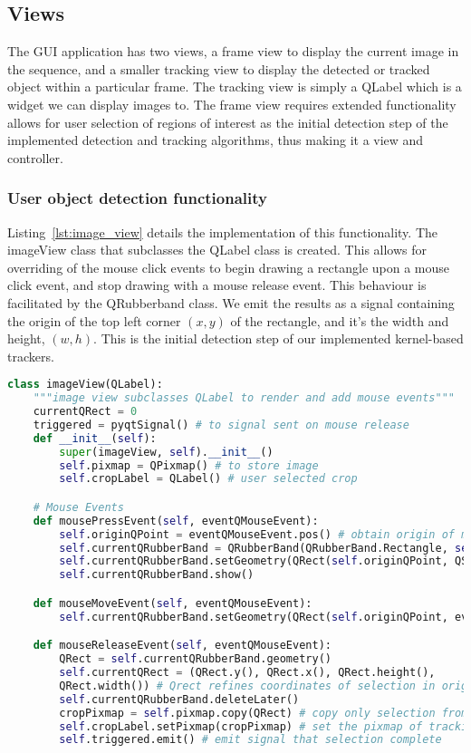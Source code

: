\subsection{Views}
The GUI application has two views, a frame view to display the current image in the
sequence, and a smaller tracking view to display the detected or tracked object
within a particular frame.  
The tracking view is simply a QLabel which is a widget we can display images to.
The frame view requires extended functionality allows for user selection of
regions of interest as the initial detection step of the implemented detection
and tracking algorithms, thus making it a view and controller.

\subsubsection{User object detection functionality}
Listing~\ref{lst:image_view} details the implementation of this
functionality. The imageView class that subclasses the QLabel class is created.
This allows for overriding of the mouse click events to begin drawing a
rectangle upon a mouse click event, and stop drawing with a mouse release event.
This behaviour is facilitated by the QRubberband class. We emit the results as
a signal containing the origin of the top left corner $(x,y)$ of the rectangle, and it's
the width and height, $(w, h)$. This is the initial detection step of our
implemented kernel-based trackers.

\begin{lstlisting}[language=Python, caption={Code for User selection of regions/objects of interest}, captionpos=b, label={lst:image_view}]
class imageView(QLabel):
    """image view subclasses QLabel to render and add mouse events"""
    currentQRect = 0
    triggered = pyqtSignal() # to signal sent on mouse release
    def __init__(self):
        super(imageView, self).__init__()
        self.pixmap = QPixmap() # to store image
        self.cropLabel = QLabel() # user selected crop

    # Mouse Events
    def mousePressEvent(self, eventQMouseEvent):
        self.originQPoint = eventQMouseEvent.pos() # obtain origin of mouse click
        self.currentQRubberBand = QRubberBand(QRubberBand.Rectangle, self) # rubberband selection
        self.currentQRubberBand.setGeometry(QRect(self.originQPoint, QSize())) # 
        self.currentQRubberBand.show()

    def mouseMoveEvent(self, eventQMouseEvent):
        self.currentQRubberBand.setGeometry(QRect(self.originQPoint, eventQMouseEvent.pos()).normalized())

    def mouseReleaseEvent(self, eventQMouseEvent):
        QRect = self.currentQRubberBand.geometry() 
        self.currentQRect = (QRect.y(), QRect.x(), QRect.height(),
        QRect.width()) # Qrect refines coordinates of selection in original image
        self.currentQRubberBand.deleteLater() 
        cropPixmap = self.pixmap.copy(QRect) # copy only selection from current frame
        self.cropLabel.setPixmap(cropPixmap) # set the pixmap of tracking view
        self.triggered.emit() # emit signal that selection complete
\end{lstlisting}



